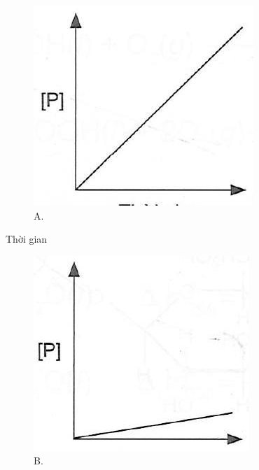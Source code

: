 \documentclass[10pt]{article}
\begin{document}
\begin{figure}[h]
\begin{center}
\captionsetup{labelformat=empty}
\caption{A.}
  \includegraphics[width=\textwidth]{2025_10_23_de6f5713836e4e91b3c8g-037(1)}
\end{center}
\end{figure}

Thời gian

\begin{figure}[h]
\begin{center}
\captionsetup{labelformat=empty}
\caption{B.}
  \includegraphics[width=\textwidth]{2025_10_23_de6f5713836e4e91b3c8g-037}
\end{center}
\end{figure}
\end{document}
